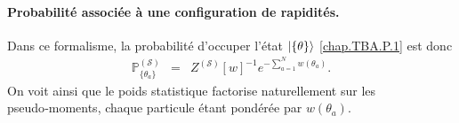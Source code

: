 \paragraph{Probabilité associée à une configuration de rapidités.}
Dans ce formalisme, la probabilité d’occuper l’état $\ket{\{\theta \}}$ \eqref{chap.TBA.P.1} est donc
\begin{eqnarray}
	\mathbb{P}^{(\mathcal{S})}_{\{ \theta_a \}} & = &  Z^{(\mathcal{S})}[w]^{-1}e^{-\sum_{a = 1}^N w(\theta_a)}\label{chap.TBA.P.w.2}. 		
\end{eqnarray}
On voit ainsi que le poids statistique factorise naturellement sur les
pseudo‑moments, chaque particule étant pondérée par $w(\theta_a)$.



